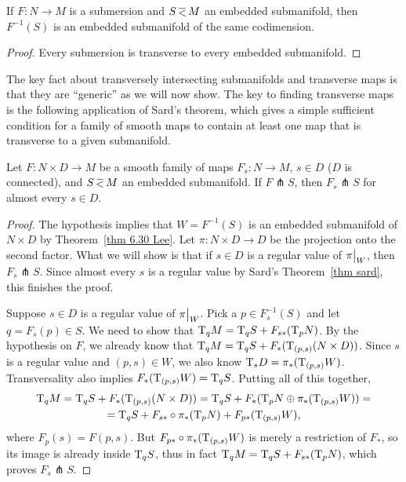 \begin{cor}
    If $F:N\to M$ is a submersion and $S\emb M$ an embedded submanifold, then $F^{-1}(S)$ is an embedded submanifold of the same codimension.
\end{cor}
\begin{proof}
    Every submersion is transverse to every embedded submanifold.
\end{proof}

The key fact about transversely intersecting submanifolds and transverse maps is that they are ``generic'' as we will now show. The key to finding transverse maps is the
following application of Sard's theorem, which gives a simple sufficient condition for
a family of smooth maps to contain at least one map that is transverse to a given submanifold.

\begin{thm}\label{thm 6.35 Lee}
    Let $F:N\times D\to M$ be a smooth family of maps $F_s:N\to M$, $s\in D$ ($D$ is connected), and $S\emb M$ an embedded submanifold. If $F \pitchfork S$, then $F_s\pitchfork S$ for almost every $s\in D$.
\end{thm}
\begin{proof}
    The hypothesis implies that $W=F^{-1}(S)$ is an embedded submanifold of $N\times D$ by Theorem~\ref{thm 6.30 Lee}. Let $\pi:N\times D\to D$ be the projection onto the second factor. What we will show is that if $s\in D$ is a regular value of $\restr{\pi}{W}$, then $F_s\pitchfork S$. Since almost every $s$ is a regular value by Sard's Theorem~\ref{thm sard}, this finishes the proof.

    Suppose $s\in D$ is a regular value of $\restr{\pi}{W}$. Pick a $p\in F_s^{-1}(S)$ and let $q=F_s(p)\in S$. We need to show that $\mathrm{T}_qM=\mathrm{T}_qS+F_{s\ast}(\mathrm{T}_pN)$. By the hypothesis on $F$, we already know that $\mathrm{T}_qM=\mathrm{T}_qS+F_\ast(\mathrm{T}_{(p,s)}(N\times D))$. Since $s$ is a regular value and $(p,s)\in W$, we also know $\mathrm{T}_sD=\pi_\ast(\mathrm{T}_{(p,s)}W)$. Transversality also implies $F_\ast(\mathrm{T}_{(p,s)}W)=\mathrm{T}_qS$. Putting all of this together,
    \begin{multline}
        \mathrm{T}_qM=\mathrm{T}_qS+F_\ast(\mathrm{T}_{(p,s)}(N\times D))=\mathrm{T}_qS+F_\ast(\mathrm{T}_pN\oplus \pi_\ast(\mathrm{T}_{(p,s)}W))=\\=\mathrm{T}_qS+F_{s\ast}\circ\pi_\ast(\mathrm{T}_pN)+F_{p\ast}(\mathrm{T}_{(p,s)}W),
    \end{multline}
    where $F_p(s)=F(p,s)$. But $F_{p\ast}\circ\pi_\ast(\mathrm{T}_{(p,s)}W)$ is merely a restriction of $F_\ast$, so its image is already inside $\mathrm{T}_qS$, thus in fact $\mathrm{T}_qM=\mathrm{T}_qS+F_{s\ast}(\mathrm{T}_pN)$, which proves $F_s\pitchfork S$.
\end{proof}



